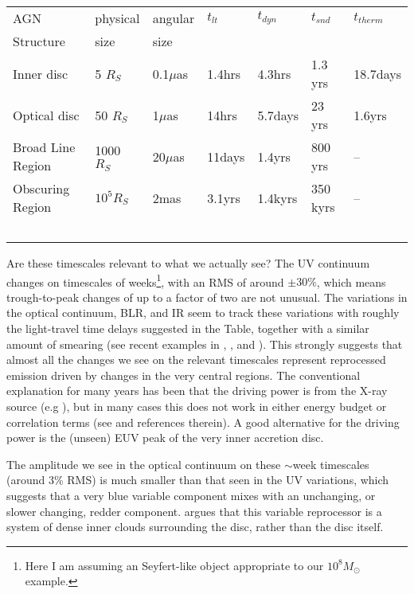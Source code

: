 \documentclass[11pt]{article}
\begin{document}
\begin{table}[!ht]
\begin{center}
\smallskip
{\small
\begin{tabular}{lllllll}  %

\hline
\noalign{\smallskip}
AGN & physical & angular & $t_{lt}$ & $t_{dyn}$ & $t_{snd}$ & $t_{therm}$ \\
\noalign{\smallskip}
Structure & size & size & &  &  & \\
\noalign{\smallskip}
\hline

\noalign{\smallskip}
Inner disc & 5 $R_S$ & 0.1$\mu$as & 1.4hrs & 4.3hrs & 1.3 yrs & 18.7days \\
\noalign{\smallskip}
Optical disc & 50 $R_S$ & 1$\mu$as & 14hrs & 5.7days & 23 yrs & 1.6yrs \\
\noalign{\smallskip}
Broad Line Region & 1000 $R_S$ & 20$\mu$as & 11days & 1.4yrs & 800 yrs & -- \\
\noalign{\smallskip}
Obscuring Region & $10^5 R_S$ & 2mas & 3.1yrs & 1.4kyrs & 350 kyrs & --  \\

\noalign{\smallskip}
\hline\
\end{tabular}
}
\end{center}
\end{table}

Are these timescales relevant to what we actually see? The UV continuum changes on timescales of weeks\footnote{Here I am assuming an Seyfert-like object appropriate to our $10^8 M_\odot$ example.}, with an RMS of around $\pm 30\%$, which means trough-to-peak changes of up to a factor of two are not unusual. The variations in the optical continuum, BLR, and IR seem to track these variations with roughly the light-travel time delays suggested in the Table, together with a similar amount of smearing (see recent examples in \citet{Edelson2015}, \cite{Grier2012}, and  \citet{Koshida2014}). This strongly suggests that almost all the changes we see on the relevant timescales represent reprocessed emission driven by changes in the very central regions. The conventional explanation for many years has been that the driving power is from the X-ray source (e.g \citet{McHardy2014}), but in many cases this does not work in either energy budget or correlation terms (see \citet{Lawrence2012} and references therein). A good alternative for the driving power is the (unseen) EUV peak of the very inner accretion disc.

The amplitude we see in the optical continuum on these $\sim$week timescales (around 3\%  RMS) is much smaller than that seen in the UV variations, which suggests that a very blue variable component mixes with an unchanging, or slower changing, redder component. \citet{Lawrence2012} argues that this variable reprocessor is a system of dense inner clouds surrounding the disc, rather than the disc itself.
\end{document}
